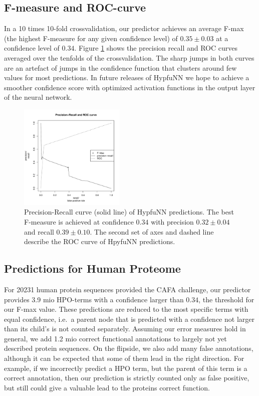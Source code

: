 \subsection*{F-measure and ROC-curve}
In a 10 times 10-fold crossvalidation, our predictor achieves an average F-max (the highest F-measure for any given confidence level) of $0.35\pm 0.03$ at a confidence level of $0.34$. Figure \ref{img:preRec_ROC} shows the precision recall and ROC curves averaged over the tenfolds of the crossvalidation. The sharp jumps in both curves are an artefact of jumps in the confidence function that clusters around few values for most predictions. In future releases of HypfuNN we hope to achieve a smoother confidence score with optimized activation functions in the output layer of the neural network.

\begin{figure}[!h]
\includegraphics[width=0.45\textwidth]{figures/PreRecROC.pdf}
\caption{Precision-Recall curve (solid line) of HypfuNN predictions. The best F-measure is achieved at confidence $0.34$ with precision $0.32 \pm 0.04$ and recall $0.39 \pm 0.10$. The second set of axes and dashed line describe the ROC curve of HpyfuNN predictions.}
\label{img:preRec_ROC}
\end{figure}

\subsection*{Predictions for Human Proteome}

For 20231 human protein sequences provided the CAFA challenge, our predictor provides 3.9 mio HPO-terms with a confidence larger than $0.34$, the threshold for our F-max value. These predictions are reduced to the most specific terms with equal confidence, i.e.~a parent node that is predicted with a confidence not larger than its child's is not counted separately. Assuming our error measures hold in general, we add 1.2 mio correct functional annotations to largely not yet described protein sequences. On the flipside, we also add many false annotations, although it can be expected that some of them lead in the right direction. For example, if we incorrectly predict a HPO term, but the parent of this term is a correct annotation, then our prediction is strictly counted only as false positive, but still could give a valuable lead to the proteins correct function.